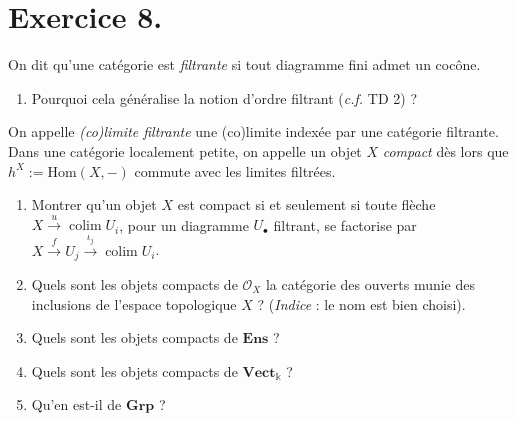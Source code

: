 \documentclass{../../td}
\begin{document}
  \chapter{Exercice 8.}

  \begin{slshape}
    \color{deepblue}
    On dit qu'une catégorie est \textit{filtrante} si tout diagramme fini admet un cocône.

    \begin{enumerate}
      \item Pourquoi cela généralise la notion d'ordre filtrant (\textit{c.f.} TD 2) ?
    \end{enumerate}
    On appelle \textit{(co)limite filtrante} une (co)limite indexée par une catégorie filtrante.
    Dans une catégorie localement petite, on appelle un objet $X$ \textit{compact} dès lors que $h^X := \mathrm{Hom}(X, -)$ commute avec les limites filtrées.

    \begin{enumerate}[resume*]
      \item Montrer qu'un objet $X$ est compact si et seulement si toute flèche $X \overset u \to \operatorname{colim} U_i$, pour un diagramme $U_\bullet$ filtrant, se factorise par  $X \overset f \to U_j \overset {\iota_j} \to \operatorname{colim} U_i$. \label{ex8-q2}
      \item Quels sont les objets compacts de $\mathcal{O}_X$ la catégorie des ouverts munie des inclusions de l'espace topologique $X$ ? (\textit{Indice} : le nom est bien choisi).
      \item Quels sont les objets compacts de $\mathbf{Ens}$ ?
      \item Quels sont les objets compacts de $\mathbf{Vect}_\mathds{k}$ ?
      \item Qu'en est-il de $\mathbf{Grp}$ ?
    \end{enumerate}
  \end{slshape}
\end{document}

